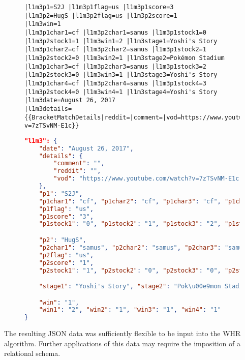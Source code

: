 \documentclass[10pt]{article}
\theoremstyle{definition}
\theoremstyle{remark}
\begin{document}
\begin{figure}[!ht]
    \begin{minipage}[t][][t]{.46\textwidth}
        \begin{lstlisting}
|l1m3p1=S2J |l1m3p1flag=us |l1m3p1score=3
|l1m3p2=HugS |l1m3p2flag=us |l1m3p2score=1
|l1m3win=1
|l1m3p1char1=cf |l1m3p2char1=samus |l1m3p1stock1=0 |l1m3p2stock1=1 |l1m3win1=2 |l1m3stage1=Yoshi's Story
|l1m3p1char2=cf |l1m3p2char2=samus |l1m3p1stock2=1 |l1m3p2stock2=0 |l1m3win2=1 |l1m3stage2=Pokémon Stadium
|l1m3p1char3=cf |l1m3p2char3=samus |l1m3p1stock3=2 |l1m3p2stock3=0 |l1m3win3=1 |l1m3stage3=Yoshi's Story
|l1m3p1char4=cf |l1m3p2char4=samus |l1m3p1stock4=3 |l1m3p2stock4=0 |l1m3win4=1 |l1m3stage4=Yoshi's Story
|l1m3date=August 26, 2017
|l1m3details={{BracketMatchDetails|reddit=|comment=|vod=https://www.youtube.com/watch?v=7zTSvNM-E1c}}
        \end{lstlisting}
    \end{minipage} \hfill
    \begin{minipage}[t][][t]{.5\textwidth}
        \begin{lstlisting}[language=json]
"l1m3": {
    "date": "August 26, 2017",
    "details": {
        "comment": "",
        "reddit": "",
        "vod": "https://www.youtube.com/watch?v=7zTSvNM-E1c"
    },
    "p1": "S2J",
    "p1char1": "cf", "p1char2": "cf", "p1char3": "cf", "p1char4": "cf",
    "p1flag": "us",
    "p1score": "3",
    "p1stock1": "0", "p1stock2": "1", "p1stock3": "2", "p1stock4": "3",

    "p2": "HugS",
    "p2char1": "samus", "p2char2": "samus", "p2char3": "samus", "p2char4": "samus",
    "p2flag": "us",
    "p2score": "1",
    "p2stock1": "1", "p2stock2": "0", "p2stock3": "0", "p2stock4": "0",

    "stage1": "Yoshi's Story", "stage2": "Pok\u00e9mon Stadium", "stage3": "Yoshi's Story", "stage4": "Yoshi's Story",

    "win": "1",
    "win1": "2", "win2": "1", "win3": "1", "win4": "1"
}
        \end{lstlisting}
    \end{minipage}
\end{figure}

The resulting JSON data was sufficiently flexible to be input into the WHR
algorithm. Further applications of this data may require the imposition of
a relational schema.
\end{document}
